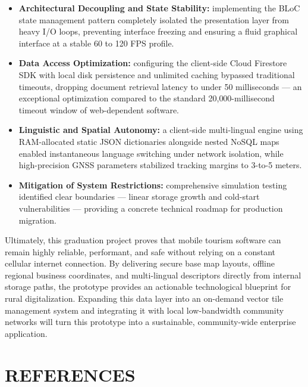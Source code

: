 \documentclass[12pt,a4paper,oneside]{report}
\begin{document}
\begin{itemize}[leftmargin=1.4em]
  \item \textbf{Architectural Decoupling and State Stability:} implementing the BLoC state
        management pattern completely isolated the presentation layer from heavy I/O loops,
        preventing interface freezing and ensuring a fluid graphical interface at a stable
        60 to 120 FPS profile.
  \item \textbf{Data Access Optimization:} configuring the client-side Cloud Firestore SDK
        with local disk persistence and unlimited caching bypassed traditional timeouts,
        dropping document retrieval latency to under 50 milliseconds --- an exceptional
        optimization compared to the standard 20{,}000-millisecond timeout window of
        web-dependent software.
  \item \textbf{Linguistic and Spatial Autonomy:} a client-side multi-lingual engine using
        RAM-allocated static JSON dictionaries alongside nested NoSQL maps enabled
        instantaneous language switching under network isolation, while high-precision GNSS
        parameters stabilized tracking margins to 3-to-5 meters.
  \item \textbf{Mitigation of System Restrictions:} comprehensive simulation testing
        identified clear boundaries --- linear storage growth and cold-start vulnerabilities
        --- providing a concrete technical roadmap for production migration.
\end{itemize}

Ultimately, this graduation project proves that mobile tourism software can remain highly
reliable, performant, and safe without relying on a constant cellular internet connection.
By delivering secure base map layouts, offline regional business coordinates, and
multi-lingual descriptors directly from internal storage paths, the prototype provides an
actionable technological blueprint for rural digitalization. Expanding this data layer into
an on-demand vector tile management system and integrating it with local low-bandwidth
community networks will turn this prototype into a sustainable, community-wide enterprise
application.

\chapter*{REFERENCES}
\end{document}
